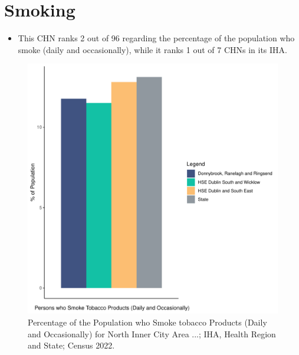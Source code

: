 \documentclass{article}
\begin{document}
\pagebreak

\section{Smoking}\label{sect:Smoking}
\begin{itemize}
\item This CHN ranks  2 out of 96 regarding the percentage of the population who smoke (daily and occasionally), while it ranks   1 out of 7 CHNs in its IHA.
\end{itemize}
\begin{figure}[H]
	\centering
	\includegraphics[width = 120mm]{../figures/SmokingED.pdf}
	\caption{Percentage of the Population who Smoke tobacco Products (Daily and Occasionally) for North Inner City Area ...; IHA, Health Region and State; Census 2022.}
	\label{fig:2ae19629-1a6a-13a3-e055-000000000001}
	\end{figure}
	
\end{document}
